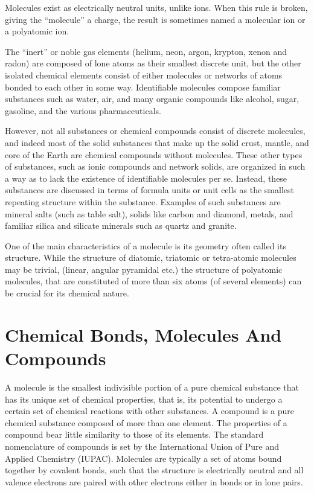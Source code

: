 Molecules exist as electrically neutral units, unlike ions. When this
rule is broken, giving the ``molecule'' a charge, the result is
sometimes named a molecular ion or a polyatomic ion.

The ``inert'' or noble gas elements (helium, neon, argon, krypton, xenon
and radon) are composed of lone atoms as their smallest discrete unit,
but the other isolated chemical elements consist of either molecules or
networks of atoms bonded to each other in some way. Identifiable
molecules compose familiar substances such as water, air, and many
organic compounds like alcohol, sugar, gasoline, and the various
pharmaceuticals.

However, not all substances or chemical compounds consist of discrete
molecules, and indeed most of the solid substances that make up the
solid crust, mantle, and core of the Earth are chemical compounds
without molecules. These other types of substances, such as ionic
compounds and network solids, are organized in such a way as to lack the
existence of identifiable molecules per se. Instead, these substances
are discussed in terms of formula units or unit cells as the smallest
repeating structure within the substance. Examples of such substances
are mineral salts (such as table salt), solids like carbon and diamond,
metals, and familiar silica and silicate minerals such as quartz and
granite.

One of the main characteristics of a molecule is its geometry often
called its structure. While the structure of diatomic, triatomic or
tetra-atomic molecules may be trivial, (linear, angular pyramidal etc.)
the structure of polyatomic molecules, that are constituted of more than
six atoms (of several elements) can be crucial for its chemical nature.

\hypertarget{molecule-and-chemical-bonds}{%
\section{Chemical Bonds, Molecules And Compounds}\label{molecule-and-chemical-bonds}}

A molecule is the smallest indivisible portion of a pure chemical substance that has its unique set of chemical properties, that is, its potential to undergo a certain set of chemical reactions with other substances. A compound is a pure chemical substance composed of more than one element. The properties of a compound bear little similarity to those of its elements. The standard nomenclature of compounds is set by the International Union of Pure and Applied Chemistry (IUPAC). Molecules are typically a set of atoms bound together by covalent bonds, such that the structure is electrically neutral and all valence electrons are paired with other electrons either in bonds or in lone pairs.

